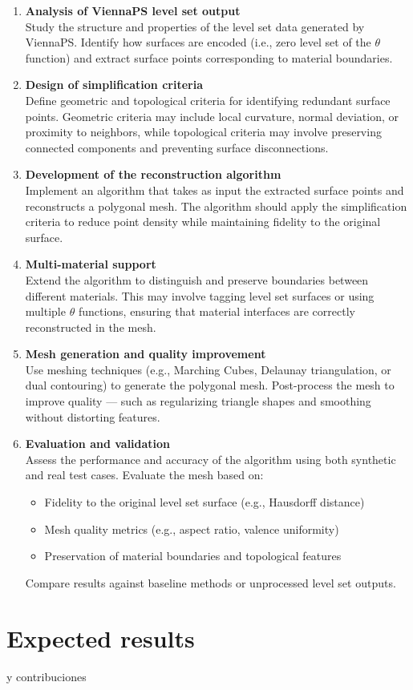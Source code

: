\documentclass[submission]{eptcs}
\begin{document}
\begin{enumerate}
    \item \textbf{Analysis of ViennaPS level set output} \\
    Study the structure and properties of the level set data generated by ViennaPS. Identify how surfaces are encoded (i.e., zero level set of the $\theta$ function) and extract surface points corresponding to material boundaries.

    \item \textbf{Design of simplification criteria} \\
    Define geometric and topological criteria for identifying redundant surface points. Geometric criteria may include local curvature, normal deviation, or proximity to neighbors, while topological criteria may involve preserving connected components and preventing surface disconnections.

    \item \textbf{Development of the reconstruction algorithm} \\
    Implement an algorithm that takes as input the extracted surface points and reconstructs a polygonal mesh. The algorithm should apply the simplification criteria to reduce point density while maintaining fidelity to the original surface.

    \item \textbf{Multi-material support} \\
    Extend the algorithm to distinguish and preserve boundaries between different materials. This may involve tagging level set surfaces or using multiple $\theta$ functions, ensuring that material interfaces are correctly reconstructed in the mesh.

    \item \textbf{Mesh generation and quality improvement} \\
    Use meshing techniques (e.g., Marching Cubes, Delaunay triangulation, or dual contouring) to generate the polygonal mesh. Post-process the mesh to improve quality — such as regularizing triangle shapes and smoothing without distorting features.

    \item \textbf{Evaluation and validation} \\
    Assess the performance and accuracy of the algorithm using both synthetic and real test cases. Evaluate the mesh based on:
    \begin{itemize}
        \item Fidelity to the original level set surface (e.g., Hausdorff distance)
        \item Mesh quality metrics (e.g., aspect ratio, valence uniformity)
        \item Preservation of material boundaries and topological features
    \end{itemize}
    Compare results against baseline methods or unprocessed level set outputs.
\end{enumerate}

\section{Expected results}

 y contribuciones

\nocite{*}


\end{document}
